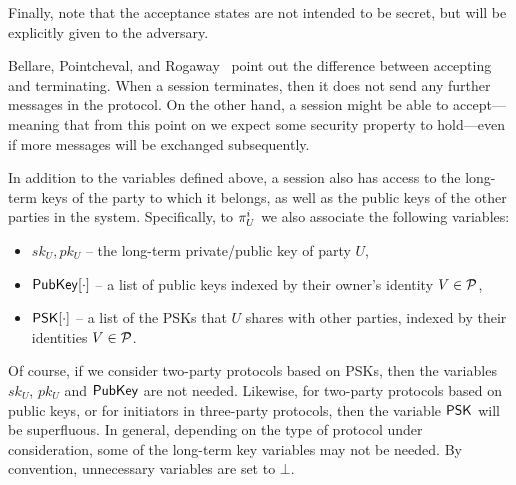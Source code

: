 Finally,
note that the acceptance states are not intended to be secret,
but will be explicitly given to the adversary.

\begin{remark}
Bellare, Pointcheval, and Rogaway~\cite[Remark~2]{EC:BelPoiRog00} point out the difference between accepting and terminating.
When a session terminates,
then it does not send any further messages in the protocol. 
On the other hand,
a session might be able to accept---meaning 
that from this point on we expect some security property to hold---even 
if more messages will be exchanged subsequently.
\end{remark}



In addition to the variables defined above,
a session also has access to the long-term keys of the party to which it belongs,
as well as the public keys of the other parties in the system.
Specifically, to $\oracle[U][i]$ we also associate the following variables:
\begin{itemize}
	
	\item $sk_U,pk_U$ -- the long-term private/public key of party $U$, 
		
	\item $\mathsf{PubKey}[\cdot]$ -- a list of public keys indexed by their owner's identity $V \in \mathcal{P}$,


	\item $\mathsf{PSK}[\cdot]$ -- a list of the PSKs that $U$ shares with other parties,
	indexed by their identities $V \in \mathcal{P}$.
	
\end{itemize}

Of course,
if we consider two-party  protocols based on PSKs,
then the variables $sk_U$, $pk_U$ and $\mathsf{PubKey}$ are not needed.
Likewise,
for two-party protocols based on public keys,
or for initiators in three-party protocols,
then the variable $\mathsf{PSK}$ will be superfluous.
In general,
depending on the type of protocol under consideration,
some of the long-term key variables may not be needed.
By convention,
unnecessary variables are set to $\bot$. 

